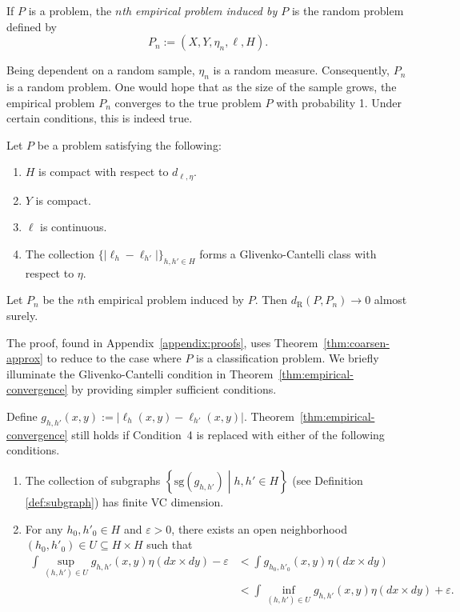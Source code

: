 \documentclass[twoside,11pt]{article}
\newcommand{\dexp}[1][]{d_{\mathrm{R}#1}}
\newcommand{\set}[2]{\left\{ #1\middle| #2\right\}}
\renewcommand{\epsilon}{\varepsilon}
\begin{document}
    \begin{definition}
        If $P$ is a problem, the \emph{$n$th empirical problem induced by $P$} is the random problem defined by
        \[P_n := (X,Y,\eta_n,\ell,H).\]
    \end{definition}

    Being dependent on a random sample, $\eta_n$ is a random measure. Consequently, $P_n$ is a random problem. One would hope that as the size of the sample grows, the empirical problem $P_n$ converges to the true problem $P$ with probability 1. Under certain conditions, this is indeed true.

    \begin{theorem}\label{thm:empirical-convergence}
        Let $P$ be a problem satisfying the following:
        \begin{enumerate}
            \item $H$ is compact with respect to $d_{\ell,\eta}$.
            \item $Y$ is compact.
            \item $\ell$ is continuous.
            \item The collection $\{|\ell_h - \ell_{h'}|\}_{h,h'\in H}$ forms a Glivenko-Cantelli class with respect to $\eta$. 
        \end{enumerate}
        Let $P_n$ be the $n$th empirical problem induced by $P$. Then $\dexp(P,P_n) \to 0$ almost surely.
    \end{theorem}

    The proof, found in Appendix~\ref{appendix:proofs}, uses Theorem~\ref{thm:coarsen-approx} to reduce to the case where $P$ is a classification problem. We briefly illuminate the Glivenko-Cantelli condition in Theorem~\ref{thm:empirical-convergence} by providing simpler sufficient conditions.
    
    \begin{proposition}\label{prop:GC-sufficient}
        Define $g_{h,h'}(x,y) := | \ell_h(x,y) - \ell_{h'}(x,y)|$.
        Theorem~\ref{thm:empirical-convergence} still holds if Condition~4 is replaced with either of the following conditions.
        \begin{enumerate}
            \item[4a.] The collection of subgraphs $\set{\mathrm{sg}(g_{h,h'})}{h,h'\in H}$ (see Definition \ref{def:subgraph})
            has finite VC dimension. 
            \item[4b.] For any $h_0,h'_0\in H$ and $\epsilon>0$, there exists an open neighborhood $(h_0,h'_0)\in U \subseteq H\times H$ such that
            \begin{align*}
                \int \sup_{(h,h')\in U} g_{h,h'}(x,y) \eta(dx{\times} dy) -\epsilon
                & <
                \int g_{h_0,h'_0}(x,y) \eta(dx{\times} dy)
                \\&<
                \int \inf_{(h,h')\in U} g_{h,h'}(x,y) \eta(dx{\times} dy) + \epsilon.
            \end{align*}
        \end{enumerate}
    \end{proposition}
\end{document}
